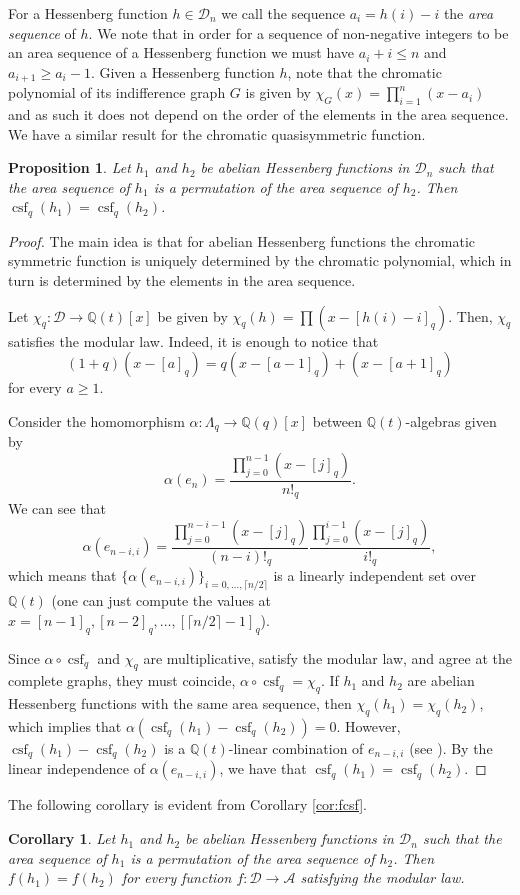 \documentclass[10pt]{amsart}
\newtheorem{Prop}[Lem]{Proposition}
\newtheorem{Cor}[Lem]{Corollary}
\theoremstyle{definition}
\newcommand{\A}{\mathcal A}
\newcommand{\col}{\colon}
\newcommand{\D}{\mathcal{D}}
\DeclareMathOperator{\csf}{csf}
\begin{document}
   For a Hessenberg function $h\in \D_n$ we call the sequence $a_i=h(i)-i$ the \emph{area sequence} of $h$. We note that in order for a sequence of non-negative integers to be an area sequence of a Hessenberg function we must have $a_i+i\leq n$ and $a_{i+1}\geq a_{i}-1$. Given a Hessenberg function $h$, note that the chromatic polynomial of its indifference graph $G$ is given by $\chi_G(x)=\prod_{i=1}^n(x-a_i)$ and as such it does not depend on the order of the elements in the area sequence.  We have a similar result for the chromatic quasisymmetric function.



\begin{Prop}
\label{prop:abelcsf}
Let $h_1$ and $h_2$ be abelian Hessenberg functions in $\D_n$ such that the area sequence of $h_1$ is a permutation of the area sequence of $h_2$. Then $\csf_q(h_1)=\csf_q(h_2)$.
\end{Prop}
\begin{proof}
The main idea is that for abelian Hessenberg functions the chromatic symmetric function is uniquely determined by the chromatic polynomial, which in turn is determined by the elements in the area sequence.\par
  Let $\chi_q\col \D\to \mathbb{Q}(t)[x]$ be given by $\chi_q(h)=\prod (x-[h(i)-i]_q)$. Then, $\chi_q$ satisfies the modular law. Indeed, it is enough to notice that
  \[
  (1+q)(x-[a]_q)=q(x-[a-1]_q)+(x-[a+1]_q)
  \]
  for every $a\geq 1$.  \par
  Consider the homomorphism $\alpha\col \Lambda_q\to \mathbb{Q}(q)[x]$ between $\mathbb{Q}(t)$-algebras given by
  \[
  \alpha(e_n)=\frac{\prod_{j=0}^{n-1} (x-[j]_q)}{n!_q}.
  \]
  We can see that
  \[
  \alpha(e_{n-i,i})=\frac{\prod_{j=0}^{n-i-1} (x-[j]_q)}{(n-i)!_q}\frac{\prod_{j=0}^{i-1} (x-[j]_q)}{i!_q},
  \]
  which means that $\{\alpha(e_{n-i,i})\}_{i=0,\ldots, \lceil n/2\rceil}$ is a linearly independent set over $\mathbb{Q}(t)$ (one can just compute the values at $x=[n-1]_q,[n-2]_q,\ldots, [\lceil n/2\rceil-1]_q$).\par
    Since $\alpha\circ \csf_q$ and $\chi_q$ are multiplicative, satisfy the modular law, and agree at the complete graphs, they must coincide, $\alpha\circ \csf_q=\chi_q$. If $h_1$ and $h_2$ are abelian Hessenberg functions with the same area sequence, then $\chi_q(h_1)=\chi_q(h_2)$, which implies that $\alpha(\csf_q(h_1)-\csf_q(h_2))=0$. However, $\csf_q(h_1)-\csf_q(h_2)$ is a $\mathbb{Q}(t)$-linear combination of $e_{n-i,i}$ (see \cite[Theorem 6.3]{ShareshianWachs}). By the linear independence of  $\alpha(e_{n-i,i})$, we have that $\csf_q(h_1)=\csf_q(h_2)$.
\end{proof}
The following corollary is evident from Corollary \ref{cor:fcsf}.
\begin{Cor}
Let $h_1$ and $h_2$ be abelian Hessenberg functions in $\D_n$ such that the area sequence of $h_1$ is a permutation of the area sequence of $h_2$. Then $f(h_1)=f(h_2)$ for every function $f\col \D\to \A$ satisfying the modular law.
\end{Cor}
\end{document}
